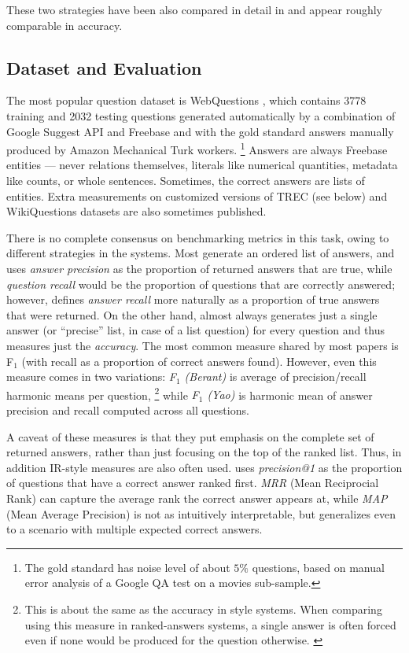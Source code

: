 These two strategies have been also compared in detail in \cite{FreebaseQA2014Yao}
and appear roughly comparable in accuracy.

\subsection{Dataset and Evaluation}

The most popular question dataset is WebQuestions \citep{WebQuestions},
which contains 3778 training and 2032 testing questions generated
automatically by a combination of Google Suggest API and Freebase
and with the gold standard answers manually produced by Amazon Mechanical Turk workers.%
\footnote{The gold standard has noise level of about $5\%$ questions,
	based on manual error analysis of a Google QA test on a movies sub-sample.}
Answers are always Freebase entities --- never relations themselves,
literals like numerical quantities, metadata like counts, or whole sentences.
Sometimes, the correct answers are lists of entities.
Extra measurements on customized versions of TREC (see below) and WikiQuestions
datasets are also sometimes published.

There is no complete consensus on benchmarking metrics in this task,
owing to different strategies in the systems.  Most generate an ordered
list of answers, and
\cite{Fader2013Paraphrase} uses \textit{answer precision} as the proportion of returned answers that are true,
while \textit{question recall} would be the proportion of questions that are correctly answered;
however,
\cite{TreeFreebase2014Yao} defines \textit{answer recall} more naturally
as a proportion of true answers that were returned.
On the other hand,
\cite{Semantic2013Berant}
almost always generates just a single
answer (or ``precise'' list, in case of a list question)
for every question and thus measures just the \textit{accuracy}.
The most common measure shared by most papers is F$_1$
(with recall as a proportion of correct answers found).
However, even this measure comes in two variations:
\textit{F$_1$ (Berant)} is average of precision/recall harmonic means per question,%
\footnote{This is about the same as the accuracy in \cite{Semantic2013Berant} style systems.
When comparing using this measure in ranked-answers systems,
a single answer is often forced even if none would be produced for the question otherwise. \citep{TreeFreebase2014Yao}}
while \textit{F$_1$ (Yao)} is harmonic mean of answer precision and recall computed across all questions.

A caveat of these measures is that they put emphasis on the complete
set of returned answers, rather than just focusing on the top of
the ranked list.  Thus, in addition IR-style measures are also often
used.
\cite{Semantic2014Bordes} uses
\textit{precision@1} as the proportion of questions that have a correct answer ranked first.
\textit{MRR} (Mean Reciprocial Rank) can capture the average rank the correct answer appears at,
while \textit{MAP} (Mean Average Precision) is not as intuitively interpretable, but generalizes
even to a scenario with multiple expected correct answers.

